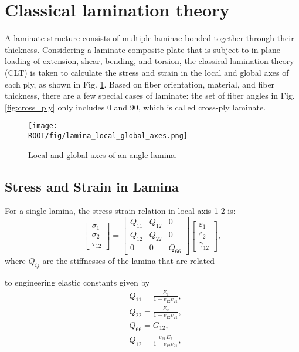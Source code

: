 \section{Classical lamination theory}
A laminate structure consists of multiple laminae bonded together through their
thickness.  Considering a laminate composite plate that is subject to in-plane
loading of extension, shear, bending, and torsion, the classical lamination
theory (CLT) is taken to calculate the stress and strain in the local and
global axes of each ply, as shown in Fig. \ref{fig:lamina}. Based on fiber
orientation, material, and fiber thickness, there are a few special cases of
laminate: the set of fiber angles in Fig. \ref{fig:cross_ply} only includes 0
and 90, which is called cross-ply laminate.

\begin{figure}[!b]
	\centering
	\texttt{[image: \\ROOT/fig/lamina\_local\_global\_axes.png]}
	\caption{Local and global axes of an angle lamina.}
  	\label{fig:lamina}
\end{figure}



\subsection{Stress and Strain in Lamina}
For a single lamina, the stress-strain relation in local axis 1-2 is:
\begin{equation}
    \begin{bmatrix}
        \sigma _1\\
        \sigma _2\\
        \tau_{12}
    \end{bmatrix}
    =
    \begin{bmatrix}
        Q_{11} & Q_{12} & 0\\
        Q_{12} & Q_{22} & 0\\
        0      &  0     & Q_{66}
    \end{bmatrix}
    \begin{bmatrix}
        \varepsilon_1\\
        \varepsilon_2\\\gamma_{12}
	\end{bmatrix} \textstyle{,}
\end{equation}
where $Q_{ij} $ are the stiffnesses of the lamina that are related

to engineering elastic constants given by
\begin{equation}
    \begin{split}
    &Q_{11}=\frac{E_1}{1-v_{12}v_{21}}\textstyle{,}\\
    &Q_{22}=\frac{E_2}{1-v_{12}v_{21}}\textstyle{,}\\
    &Q_{66}=G_{12}\textstyle{,}\\
    &Q_{12}=\frac{v_{21}E_2}{1-v_{12}v_{21}}\textstyle{,}\\
    \end{split}
\end{equation}

